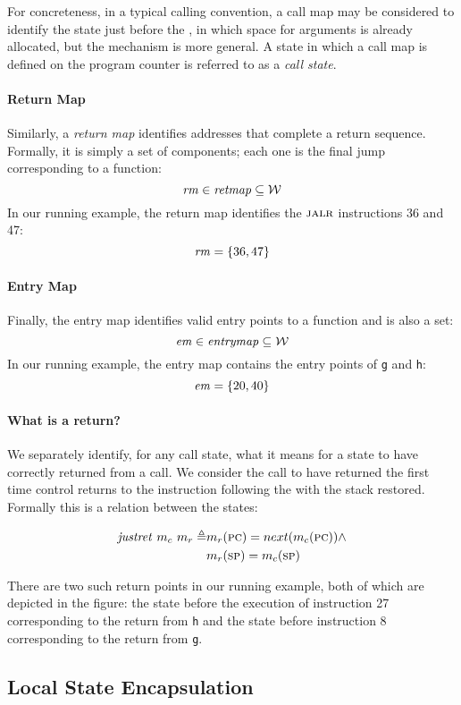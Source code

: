 \documentclass[acmsmall,review,anonymous]{acmart}\settopmatter{printfolios=true,printccs=false,printacmref=false}
\begin{document}
For concreteness, in a typical calling convention, a call map may be
considered to identify the state just before the \jal, in which
space for arguments is already allocated, but the mechanism is more
general. A state in which a call map is defined on the program counter
is referred to as a {\it call state}.

\paragraph*{Return Map}
Similarly, a {\em return map} identifies addresses that complete a
return sequence. Formally, it is simply a set of components; each one
is the final jump corresponding to a function:
%
\[\mathit{rm} \in \mathit{retmap} \subseteq {\mathcal W}\]
%
In our running example, the return map identifies the $\textsc{jalr}$
instructions 36 and 47:
\[ \mathit{rm} = \{36, 47\} \]

\paragraph*{Entry Map}
Finally, the entry map identifies valid entry points to a
function and is also a set:
\[\mathit{em} \in \mathit{entrymap} \subseteq {\mathcal W}\]
%
In our running example, the entry map contains the entry
points of {\tt g} and {\tt h}:
\[ \mathit{em} = \{20, 40\} \]

\paragraph*{What is a return?}

We separately identify, for any call state, what it means for a state
to have correctly returned from a call. We consider the call to have
returned the first time control returns to the instruction following
the \jal with the stack restored. Formally this is a relation
between the states:

\[\begin{split}
    \mathit{justret}\ m_c\ m_r \triangleq & m_r(\textsc{pc}) =
    next(m_c(\textsc{pc})) \land \\ & m_r(\textsc{sp}) = m_c(\textsc{sp})
\end{split}\]

There are two such return points in our running example, both of which
are depicted in the figure: the state before the execution of
instruction 27 corresponding to the return from {\tt h} and the state
before instruction 8 corresponding to the return from {\tt g}.

\subsection{Local State Encapsulation}
\label{sec:lse}
\end{document}
